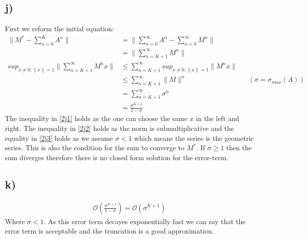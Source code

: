 \documentclass[a4paper,12pt]{ETHexercise}
\begin{document}
\subsection*{j)}
First we reform the initial equation:
\begin{align}
    \lVert M^* - \sum_{n=0}^K A^n \rVert &= \lVert \sum_{n=0}^\infty A^n - \sum^{\infty}_{n=0} M^n \rVert\\
    &= \lVert \sum^{\infty}_{n=K+1} M^n \rVert\\
    sup_{x \neq 0; \lVert x \rVert =1} \lVert \sum^{\infty}_{n=K+1} M^n x \rVert
    &\leq \sum^{\infty}_{n=K+1} sup_{x \neq 0; \lVert x \rVert =1} \lVert M^n x \rVert \label{2j1}\\
    &\leq \sum^{\infty}_{n=K+1} \lVert M \rVert^n &&(\sigma = \sigma_{max}(A)) \label{2j2}\\
    &= \sum^{\infty}_{n=K+1} \sigma^n \\
    &= \frac{\sigma^{K+1}}{1-\sigma} \label{2j3}
\end{align}
The inequality in \eqref{2j1} holds as the one can choose the same $x$ in the left and right. The inequality in \eqref{2j2} holds as the norm is submultiplicative and the equality in \eqref{2j3} holds as we assume $\sigma < 1$ which means the series is the geometric series. This is also the condition for the sum to converge to $M^*$. If $\sigma \geq 1$ then the sum diverges therefore there is no closed form solution for the error-term.

\subsection*{k)}
\begin{align}
    \mathcal{O} \left( \frac{\sigma^{K+1}}{1-\sigma} \right) =  \mathcal{O} \left(\sigma^{K+1}\right)
\end{align}
Where $\sigma < 1$.
As this error term decayes exponentially fast we can say that the error term is acceptable and the truncation is a good approximation.
\end{document}
